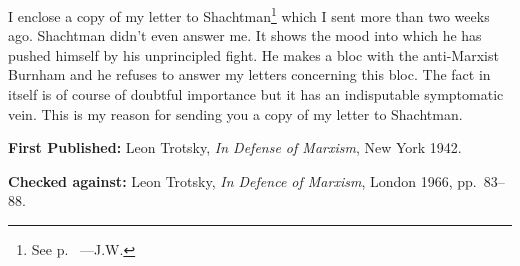 I enclose a copy of my letter to Shachtman\footnote{See p.~\pageref{1939-12-20_a-letter-to-max-shachtman} ---J.W.} which I sent more than two weeks ago. Shachtman didn’t even answer me. It shows the mood into which he has pushed himself by his unprincipled fight. He makes a bloc with the anti-Marxist Burnham and he refuses to answer my letters concerning this bloc. The fact in itself is of course of doubtful importance but it has an indisputable symptomatic vein. This is my reason for sending you a copy of my letter to Shachtman.


\begin{letterinfo}
	\textbf{First Published:} Leon Trotsky, \emph{In Defense of Marxism}, New York 1942.
	
	\textbf{Checked against:} Leon Trotsky, \emph{In Defence of Marxism}, London 1966, pp.~83--88.
\end{letterinfo}
